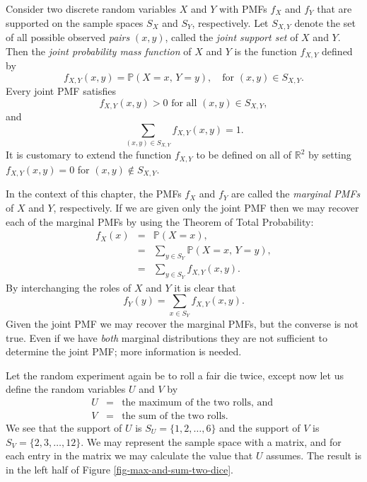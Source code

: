 Consider two discrete random variables \(X\) and \(Y\) with PMFs
\(f_{X}\) and \(f_{Y}\) that are supported on the sample spaces
\(S_{X}\) and \(S_{Y}\), respectively. Let \(S_{X,Y}\) denote the set
of all possible observed \emph{pairs} \((x,y)\), called the \emph{joint support
set} of \(X\) and \(Y\). Then the \emph{joint probability mass function} of
\(X\) and \(Y\) is the function \(f_{X,Y}\) defined by
\begin{equation}
\label{eq-joint-pmf}
f_{X,Y}(x,y)=\mathbb{P}(X=x,\, Y=y),\quad \mbox{for }(x,y)\in S_{X,Y}.
\end{equation}
Every joint PMF satisfies
\begin{equation}
f_{X,Y}(x,y)>0\mbox{ for all }(x,y)\in S_{X,Y},
\end{equation}
and
\begin{equation}
\sum_{(x,y)\in S_{X,Y}}f_{X,Y}(x,y)=1.
\end{equation}
It is customary to extend the function \(f_{X,Y}\) to be defined on
all of \(\mathbb{R}^{2}\) by setting \(f_{X,Y}(x,y)=0\) for
\((x,y)\not\in S_{X,Y}\).

In the context of this chapter, the PMFs \(f_{X}\) and \(f_{Y}\) are
called the \emph{marginal PMFs} of \(X\) and \(Y\), respectively. If we are
given only the joint PMF then we may recover each of the marginal PMFs
by using the Theorem of Total Probability:
\begin{eqnarray}
f_{X}(x) & = & \mathbb{P}(X=x),\\
 & = & \sum_{y\in S_{Y}}\mathbb{P}(X=x,\, Y=y),\\
 & = & \sum_{y\in S_{Y}}f_{X,Y}(x,y).
\end{eqnarray}
By interchanging the roles of \(X\) and \(Y\) it is clear that 
\begin{equation}
\label{eq-marginal-pmf}
f_{Y}(y)=\sum_{x\in S_{Y}}f_{X,Y}(x,y).
\end{equation}
Given the joint PMF we may recover the marginal PMFs, but the converse
is not true. Even if we have \emph{both} marginal distributions they are
not sufficient to determine the joint PMF; more information is
needed.

\label{exa-max-sum-two-dice} Let the random experiment again be to roll a
fair die twice, except now let us define the random variables \(U\)
and \(V\) by
\begin{eqnarray*}
U & = & \mbox{the maximum of the two rolls, and }\\
V & = & \mbox{the sum of the two rolls.}
\end{eqnarray*}
We see that the support of \(U\) is \(S_{U}= \{ 1,2,\ldots,6 \} \) and
the support of \(V\) is \(S_{V}= \{ 2,3,\ldots,12 \} \). We may
represent the sample space with a matrix, and for each entry in the
matrix we may calculate the value that \(U\) assumes. The result is in
the left half of Figure \ref{fig-max-and-sum-two-dice}.

